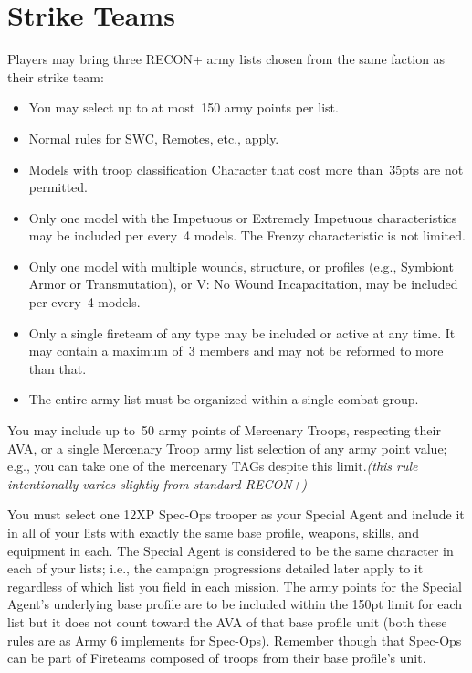 \chapter{Strike Teams}

Players may bring three RECON+ army lists chosen from the same
faction as their strike team:


\begin{itemize}
\item You may select up to at most~150 army points per list.

\item Normal rules for SWC, Remotes, etc., apply.

\item Models with troop classification Character that cost more
  than~35pts are not permitted.

\item Only one model with the Impetuous or Extremely Impetuous
  characteristics may be included per every~4 models.  The Frenzy
  characteristic is not limited.

\item Only one model with multiple wounds, structure, or profiles
  (e.g., Symbiont Armor or Transmutation), or V: No Wound
  Incapacitation, may be included per every~4 models.
  
\item Only a single fireteam of any type may be included or active at
  any time.  It may contain a maximum of~3 members and may not be
  reformed to more than that.

\item The entire army list must be organized within a single combat
  group.
\end{itemize}


  You may include up to~50 army points of
Mercenary Troops, respecting their AVA, or a single Mercenary Troop
army list selection of any army point value; e.g., you can take one of
the mercenary TAGs despite this limit.\hfill\textit{(this rule
  intentionally varies slightly from standard RECON+)}

  You must select one 12XP Spec-Ops
trooper as your Special Agent and include it in all of your lists with
exactly the same base profile, weapons, skills, and equipment in each.
The Special Agent is considered to be the same character in each of
your lists; i.e., the campaign progressions detailed later apply to it
regardless of which list you field in each mission.  The army points
for the Special Agent's underlying base profile are to be included
within the 150pt limit for each list but it does not count toward the
AVA of that base profile unit (both these rules are as Army 6
implements for Spec-Ops).  Remember though that Spec-Ops can be part
of Fireteams composed of troops from their base profile's unit.

